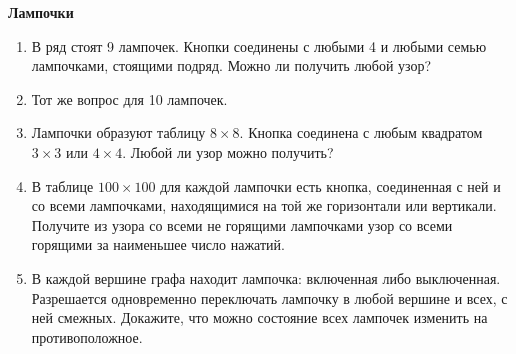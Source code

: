 \documentclass{article}
\begin{document}
\large
	
\begin{center}
	\textbf{Лампочки}
\end{center}


\begin{enumerate}[label*=\protect\fbox{\arabic{enumi}}]
	
\item В ряд стоят 9 лампочек. Кнопки соединены с любыми 4 и любыми семью лампочками, стоящими подряд. Можно ли получить любой узор?
\item Тот же вопрос для 10 лампочек.
\item Лампочки образуют таблицу $8 \times 8$. Кнопка соединена с любым квадратом $3 \times 3$
или $4 \times 4$. Любой ли узор можно получить?
\item В таблице $100 \times 100$ для каждой лампочки есть кнопка, соединенная с ней и со всеми лампочками, находящимися на той же горизонтали или вертикали. Получите из узора со всеми не горящими лампочками узор со всеми горящими за наименьшее число нажатий.
\item В каждой вершине графа находит лампочка: включенная либо выключенная. Разрешается одновременно переключать лампочку в любой вершине и всех, с ней смежных. Докажите, что можно состояние всех лампочек изменить на противоположное.
\end{enumerate}
\end{document}
